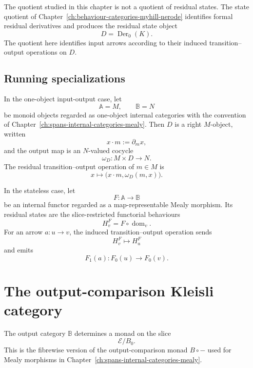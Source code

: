 \begin{remark}
\label{rem:syn-to-state-versus-operation-early}
    The quotient studied in this chapter is not a quotient of residual states.
    The state quotient of Chapter~\ref{ch:behaviour-categories-myhill-nerode}
    identifies formal residual derivatives and produces the residual state
    object
    \[
        D=\operatorname{Der}_0(K).
    \]
    The quotient here identifies input arrows according to their induced
    transition--output operations on \(D\).
\end{remark}

\subsection{Running specializations}
\label{subsec:syn-to-standing-running-specializations}

In the one-object input-output case, let
\[
    \mathbb A=M,
    \qquad
    \mathbb B=N
\]
be monoid objects regarded as one-object internal categories with the convention
of Chapter~\ref{ch:spans-internal-categories-mealy}. Then \(D\) is a right
\(M\)-object, written
\[
    x\cdot m:=\partial_mx,
\]
and the output map is an \(N\)-valued cocycle
\[
    \omega_D:M\times D\to N.
\]
The residual transition--output operation of \(m\in M\) is
\[
    x\longmapsto
    \bigl(x\cdot m,\omega_D(m,x)\bigr).
\]

In the stateless case, let
\[
    F:\mathbb A\to\mathbb B
\]
be an internal functor regarded as a map-representable Mealy morphism. Its
residual states are the slice-restricted functorial behaviours
\[
    H_v^F=F\circ\operatorname{dom}_v.
\]
For an arrow \(a:u\to v\), the induced transition--output operation sends
\[
    H_v^F\longmapsto H_u^F
\]
and emits
\[
    F_1(a):F_0(u)\to F_0(v).
\]

\section{The output-comparison Kleisli category}
\label{sec:syn-to-output-comparison-kleisli-category}

The output category \(\mathbb B\) determines a monad on the slice
\[
    \mathcal E/B_0.
\]
This is the fibrewise version of the output-comparison monad \(B\circ-\) used
for Mealy morphisms in Chapter~\ref{ch:spans-internal-categories-mealy}.

